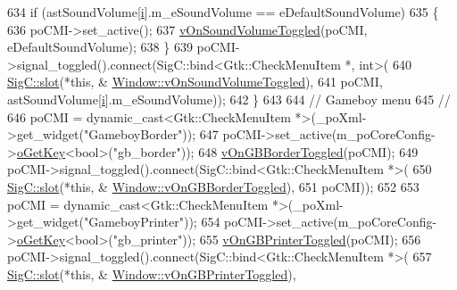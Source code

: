 \begin{DoxyCode}
{{634     \textcolor{keywordflow}{if} (astSoundVolume[\mbox{\hyperlink{expr-lex_8cpp_acb559820d9ca11295b4500f179ef6392}{i}}].m\_eSoundVolume == eDefaultSoundVolume)
635     \{
636       poCMI->set\_active();
637       \mbox{\hyperlink{class_v_b_a_1_1_window_a6e1456ec5b5efc3a5e24d91ed918d503}{vOnSoundVolumeToggled}}(poCMI, eDefaultSoundVolume);
638     \}
639     poCMI->signal\_toggled().connect(SigC::bind<Gtk::CheckMenuItem *, int>(
640                                       \mbox{\hyperlink{namespace_sig_c_a92e4f19202b77e78ac1db05f5a62f6b6}{SigC::slot}}(*\textcolor{keyword}{this}, &
      \mbox{\hyperlink{class_v_b_a_1_1_window_a6e1456ec5b5efc3a5e24d91ed918d503}{Window::vOnSoundVolumeToggled}}),
641                                       poCMI, astSoundVolume[\mbox{\hyperlink{expr-lex_8cpp_acb559820d9ca11295b4500f179ef6392}{i}}].m\_eSoundVolume));
642   \}
643 
644   \textcolor{comment}{// Gameboy menu}
645   \textcolor{comment}{//}
646   poCMI = \textcolor{keyword}{dynamic\_cast<}Gtk::CheckMenuItem *\textcolor{keyword}{>}(\_poXml->get\_widget(\textcolor{stringliteral}{"GameboyBorder"}));
647   poCMI->set\_active(m\_poCoreConfig->\mbox{\hyperlink{class_v_b_a_1_1_config_1_1_section_ab169d7aae4e9dde91418ba1668e3ad39}{oGetKey}}<\textcolor{keywordtype}{bool}>(\textcolor{stringliteral}{"gb\_border"}));
648   \mbox{\hyperlink{class_v_b_a_1_1_window_aa7cf1b717713eb050de751b12ddfe72a}{vOnGBBorderToggled}}(poCMI);
649   poCMI->signal\_toggled().connect(SigC::bind<Gtk::CheckMenuItem *>(
650                                     \mbox{\hyperlink{namespace_sig_c_a92e4f19202b77e78ac1db05f5a62f6b6}{SigC::slot}}(*\textcolor{keyword}{this}, &
      \mbox{\hyperlink{class_v_b_a_1_1_window_aa7cf1b717713eb050de751b12ddfe72a}{Window::vOnGBBorderToggled}}),
651                                     poCMI));
652 
653   poCMI = \textcolor{keyword}{dynamic\_cast<}Gtk::CheckMenuItem *\textcolor{keyword}{>}(\_poXml->get\_widget(\textcolor{stringliteral}{"GameboyPrinter"}));
654   poCMI->set\_active(m\_poCoreConfig->\mbox{\hyperlink{class_v_b_a_1_1_config_1_1_section_ab169d7aae4e9dde91418ba1668e3ad39}{oGetKey}}<\textcolor{keywordtype}{bool}>(\textcolor{stringliteral}{"gb\_printer"}));
655   \mbox{\hyperlink{class_v_b_a_1_1_window_a2d6e4c0bd7467305b02bd6f5b0343f26}{vOnGBPrinterToggled}}(poCMI);
656   poCMI->signal\_toggled().connect(SigC::bind<Gtk::CheckMenuItem *>(
657                                     \mbox{\hyperlink{namespace_sig_c_a92e4f19202b77e78ac1db05f5a62f6b6}{SigC::slot}}(*\textcolor{keyword}{this}, &
      \mbox{\hyperlink{class_v_b_a_1_1_window_a2d6e4c0bd7467305b02bd6f5b0343f26}{Window::vOnGBPrinterToggled}}),
}}
\end{DoxyCode}
